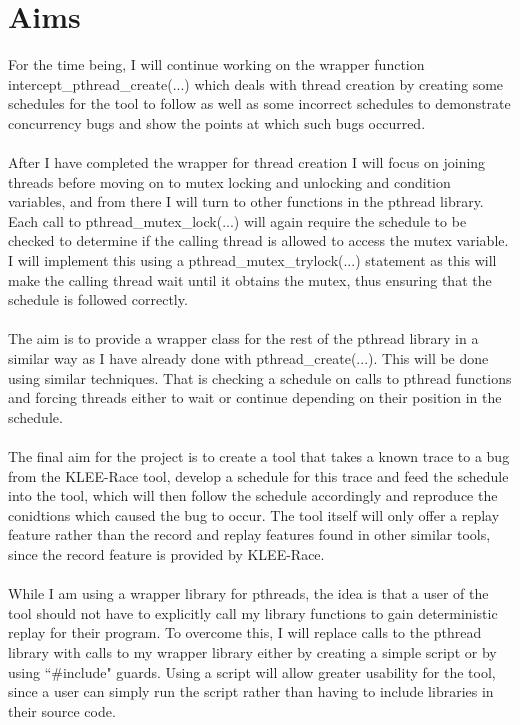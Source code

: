\documentclass[a4paper,11pt]{article}
\begin{document}
\section{Aims}
For the time being,  I will continue working on the wrapper function intercept\_pthread\_create(...) which deals with thread creation by creating some schedules for the tool to follow as well as some incorrect schedules to demonstrate concurrency bugs and show the points at which such bugs occurred.
\\
\\
After I have completed the wrapper for thread creation I will focus on joining threads before moving on to mutex locking and unlocking and condition variables, and from there I will turn to other functions in the pthread library. Each call to pthread\_mutex\_lock(...) will again require the schedule to be checked to determine if the calling thread is allowed to access the mutex variable. I will implement this using a pthread\_mutex\_trylock(...) statement as this will make the calling thread wait until it obtains the mutex, thus ensuring that the schedule is followed correctly.
\\
\\
The aim is to provide a wrapper class for the rest of the pthread library in a similar way as I have already done with pthread\_create(...). This will be done using similar techniques. That is checking a schedule on calls to pthread functions and forcing threads either to wait or continue depending on their position in the schedule.
\\
\\
The final aim for the project is to create a tool that takes a known trace to a bug from the KLEE-Race tool, develop a schedule for this trace and feed the schedule into the tool, which will then follow the schedule accordingly and reproduce the conidtions  which caused the bug to occur. The tool itself will only offer a replay feature rather than the record and replay features found in other similar tools, since the record feature is provided by KLEE-Race.
\\
\\
While I am using a wrapper library for pthreads, the idea is that a user of the tool should not have to explicitly call my library functions to gain deterministic replay for their program. To overcome this, I will replace calls to the pthread library with calls to my wrapper library either by creating a simple script or by using ``\#include" guards. Using a script will allow greater usability for the tool, since a user can simply run the script rather than having to include libraries in their source code.
\end{document}
